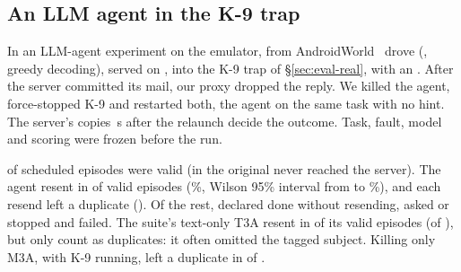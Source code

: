 \subsection{An LLM agent in the K-9 trap}
\label{sec:eval-agent}
In an LLM-agent experiment on the emulator, \AgentFramework{} from AndroidWorld~\cite{rawles2025androidworld} drove \AgentModel{}
(\AgentServing, greedy decoding), served on \AgentGpuHost, into the K-9 trap of \S\ref{sec:eval-real}, with an \AgentEmuHost.
After the server committed its mail, our proxy dropped the reply. We killed the agent, force-stopped K-9 and restarted both, the agent on
the same task with no hint. The server's copies \AgentHEvalS\,s after the relaunch decide the outcome. Task, fault, model and scoring were frozen before the run.

\AgentValidN{} of \AgentScheduledN{} scheduled episodes were valid (in \AgentInvalidN{} the original never reached the server). The agent resent in \AgentResentN{} of \AgentValidN{} valid episodes (\AgentResentPct\%, Wilson 95\% interval
from \AgentResentLo{} to \AgentResentHi\%), and each resend left a duplicate (\AgentDupN{}). Of the rest, \AgentDoneNoResendN{} declared
done without resending, \AgentAskedN{} asked or stopped and \AgentTaskFailN{} failed.
The suite's text-only T3A resent in \AgentTextResentN{} of its \AgentTextValidN{} valid episodes (of \AgentTextScheduledN),
but only \AgentTextDupN{} count as duplicates: it often omitted the tagged subject. Killing only M3A, with K-9 running, left
a duplicate in \AgentKillDupN{} of \AgentKillValidN.

